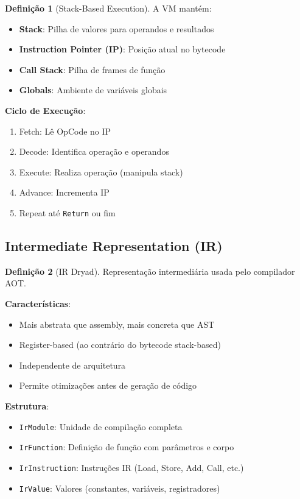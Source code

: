 \documentclass[12pt,a4paper]{article}
\theoremstyle{definition}
\newtheorem{definition}{Definição}[section]
\begin{document}
\begin{definition}[Stack-Based Execution]
A VM mantém:
\begin{itemize}
    \item \textbf{Stack}: Pilha de valores para operandos e resultados
    \item \textbf{Instruction Pointer (IP)}: Posição atual no bytecode
    \item \textbf{Call Stack}: Pilha de frames de função
    \item \textbf{Globals}: Ambiente de variáveis globais
\end{itemize}

\textbf{Ciclo de Execução}:
\begin{enumerate}
    \item Fetch: Lê OpCode no IP
    \item Decode: Identifica operação e operandos
    \item Execute: Realiza operação (manipula stack)
    \item Advance: Incrementa IP
    \item Repeat até \texttt{Return} ou fim
\end{enumerate}
\end{definition}

\subsection{Intermediate Representation (IR)}

\begin{definition}[IR Dryad]
Representação intermediária usada pelo compilador AOT.

\textbf{Características}:
\begin{itemize}
    \item Mais abstrata que assembly, mais concreta que AST
    \item Register-based (ao contrário do bytecode stack-based)
    \item Independente de arquitetura
    \item Permite otimizações antes de geração de código
\end{itemize}

\textbf{Estrutura}:
\begin{itemize}
    \item \texttt{IrModule}: Unidade de compilação completa
    \item \texttt{IrFunction}: Definição de função com parâmetros e corpo
    \item \texttt{IrInstruction}: Instruções IR (Load, Store, Add, Call, etc.)
    \item \texttt{IrValue}: Valores (constantes, variáveis, registradores)
\end{itemize}
\end{definition}
\end{document}
